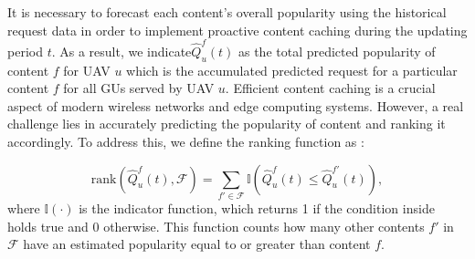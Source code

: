 \documentclass[journal]{IEEEtran}
\begin{document}
It is necessary to forecast each content's overall popularity using the historical request data in order to implement proactive content caching during the updating period $t$. As a result, we indicate\(\hat{Q}^{f}_{u}(t)\) as the total predicted popularity of content $f$ for UAV $u$ which is the accumulated predicted request for a particular content $f$ for all GUs served by UAV $u$. Efficient content caching is a crucial aspect of modern wireless networks and edge computing systems.  However, a real challenge lies in accurately predicting the popularity of content and ranking it accordingly. To address this, we define the ranking function as \cite{9215049}:

\begin{equation} 
\text{rank}(\hat{Q}^{f}_{u}(t), \mathcal{F}) = \sum _ {f' \in \mathcal {F}} \boldsymbol {\mathbb{I}}\left (\hat{Q}^{f}_{u}(t) \leq \hat{Q}^{f'}_{u}(t) \right), 
\label{rank}
\end{equation} 
where $\mathbb{I}(\cdot)$ is the indicator function, which returns 1 if the condition inside holds true and 0 otherwise. This function counts how many other contents $f'$ in $\mathcal{F}$ have an estimated popularity equal to or greater than content $f$.




\end{document}
